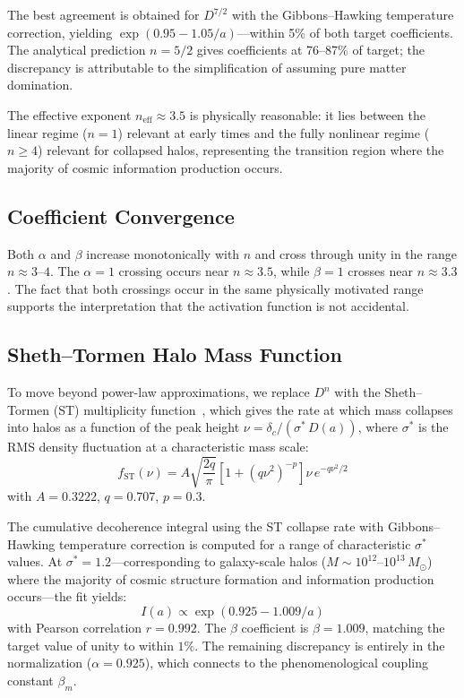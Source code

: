 \documentclass[11pt]{article}
\begin{document}
The best agreement is obtained for $D^{7/2}$ with the Gibbons--Hawking
temperature correction, yielding $\exp(0.95 - 1.05/a)$---within 5\% of both
target coefficients.  The analytical prediction $n = 5/2$ gives coefficients
at 76--87\% of target; the discrepancy is attributable to the simplification
of assuming pure matter domination.

The effective exponent $n_\mathrm{eff} \approx 3.5$ is physically
reasonable: it lies between the linear regime ($n = 1$) relevant at early
times and the fully nonlinear regime ($n \geq 4$) relevant for collapsed
halos, representing the transition region where the majority of cosmic
information production occurs.

\subsection{Coefficient Convergence}

Both $\alpha$ and $\beta$ increase monotonically with $n$ and cross through
unity in the range $n \approx 3$--$4$.  The $\alpha = 1$ crossing occurs
near $n \approx 3.5$, while $\beta = 1$ crosses near $n \approx 3.3$.  The
fact that both crossings occur in the same physically motivated range
supports the interpretation that the activation function is not accidental.

\subsection{Sheth--Tormen Halo Mass Function}

To move beyond power-law approximations, we replace $D^n$ with the
Sheth--Tormen (ST) multiplicity function~\citep{ShethTormen1999}, which
gives the rate at which mass collapses into halos as a function of the peak
height $\nu = \delta_c/(\sigma^*\,D(a))$, where $\sigma^*$ is the RMS
density fluctuation at a characteristic mass scale:
\begin{equation}
f_\mathrm{ST}(\nu) = A\sqrt{\frac{2q}{\pi}}
\left[1 + (q\nu^2)^{-p}\right]\nu\,e^{-q\nu^2/2}
\end{equation}
with $A = 0.3222$, $q = 0.707$, $p = 0.3$.

The cumulative decoherence integral using the ST collapse rate with
Gibbons--Hawking temperature correction is computed for a range of
characteristic $\sigma^*$ values.  At $\sigma^* = 1.2$---corresponding to
galaxy-scale halos ($M \sim 10^{12}$--$10^{13}\,M_\odot$) where the
majority of cosmic structure formation and information production
occurs---the fit yields:
\begin{equation}
I(a) \propto \exp(0.925 - 1.009/a)
\end{equation}
with Pearson correlation $r = 0.992$.  The $\beta$ coefficient is
$\beta = 1.009$, matching the target value of unity to within $1\%$.  The
remaining discrepancy is entirely in the normalization ($\alpha = 0.925$),
which connects to the phenomenological coupling constant $\beta_m$.
\end{document}
